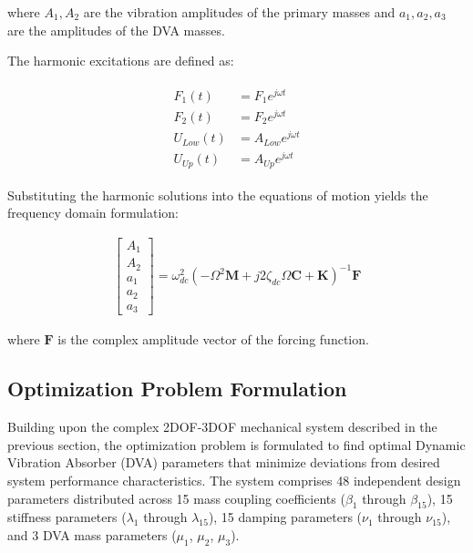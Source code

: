 \documentclass[12pt,a4paper]{article}
\begin{document}
where $A_1, A_2$ are the vibration amplitudes of the primary masses and $a_1, a_2, a_3$ are the amplitudes of the DVA masses.

The harmonic excitations are defined as:

\begin{align}\label{Eq.harmonic.excitations.2dof3dof}
    \begin{split}
        F_1(t) &= F_1 e^{j \omega t} \\
        F_2(t) &= F_2 e^{j \omega t} \\
        U_{Low}(t) &= A_{Low} e^{j \omega t} \\
        U_{Up}(t) &= A_{Up} e^{j \omega t}
    \end{split}
\end{align}

Substituting the harmonic solutions into the equations of motion yields the frequency domain formulation:

\begin{align}\label{Eq.frequency.domain.2dof3dof}
    \begin{bmatrix}
        A_1 \\
        A_2 \\
        a_1 \\
        a_2 \\
        a_3
    \end{bmatrix} = \omega_{dc}^2 \left( -\Omega^2 \mathbf{M} + j 2 \zeta_{dc} \Omega \mathbf{C} + \mathbf{K} \right)^{-1} \mathbf{F}
\end{align}

where $\mathbf{F}$ is the complex amplitude vector of the forcing function.



\subsection{Optimization Problem Formulation}

Building upon the complex 2DOF-3DOF mechanical system described in the previous section, the optimization problem is formulated to find optimal Dynamic Vibration Absorber (DVA) parameters that minimize deviations from desired system performance characteristics. The system comprises 48 independent design parameters distributed across 15 mass coupling coefficients ($\beta_1$ through $\beta_{15}$), 15 stiffness parameters ($\lambda_1$ through $\lambda_{15}$), 15 damping parameters ($\nu_1$ through $\nu_{15}$), and 3 DVA mass parameters ($\mu_1$, $\mu_2$, $\mu_3$).
\end{document}
